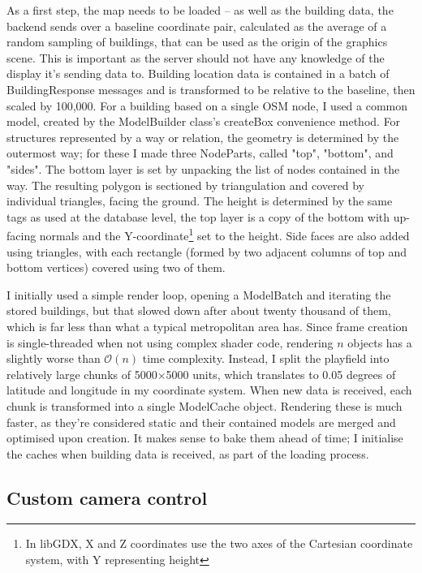 As a first step, the map needs to be loaded -- as well as the building data, the backend sends over a baseline coordinate pair, calculated as the average of a random sampling of buildings, that can be used as the origin of the graphics scene. This is important as the server should not have any knowledge of the display it's sending data to. Building location data is contained in a batch of BuildingResponse messages and is transformed to be relative to the baseline, then scaled by 100,000. For a building based on a single OSM node, I used a common model, created by the ModelBuilder class's createBox convenience method. For structures represented by a way or relation, the geometry is determined by the outermost way; for these I made three NodeParts, called "top", "bottom", and "sides". The bottom layer is set by unpacking the list of nodes contained in the way. The resulting polygon is sectioned by triangulation and covered by individual triangles, facing the ground. The height is determined by the same tags as used at the database level, the top layer is a copy of the bottom with up-facing normals and the Y-coordinate\footnote{In libGDX, X and Z coordinates use the two axes of the Cartesian coordinate system, with Y representing height} set to the height. Side faces are also added using triangles, with each rectangle (formed by two adjacent columns of top and bottom vertices) covered using two of them.

I initially used a simple render loop, opening a ModelBatch and iterating the stored buildings, but that slowed down after about twenty thousand of them, which is far less than what a typical metropolitan area has. Since frame creation is single-threaded when not using complex shader code, rendering $n$ objects has a slightly worse than $\mathcal{O}(n)$ time complexity. Instead, I split the playfield into relatively large chunks of 5000$\times$5000 units, which translates to 0.05 degrees of latitude and longitude in my coordinate system. When new data is received, each chunk is transformed into a single ModelCache object. Rendering these is much faster, as they're considered static and their contained models are merged and optimised upon creation.\cite{LibgdxModelCache} It makes sense to bake them ahead of time; I initialise the caches when building data is received, as part of the loading process.

\subsection{Custom camera control}


